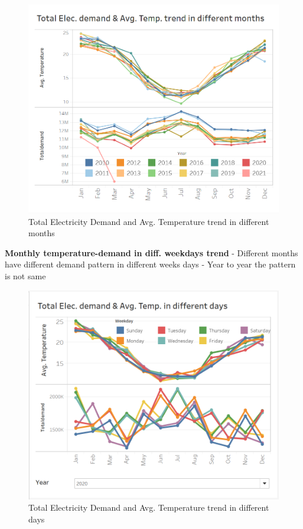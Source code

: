 \documentclass[mstat,12pt]{unswthesis}
\begin{document}
\begin{figure}[H]
\includegraphics{snapshots1/Slide 2 snapshot.png}
\caption{Total Electricity Demand and Avg. Temperature trend in different months}\label{4.1}
\end{figure}

\textbf{Monthly temperature-demand in diff. weekdays trend} \newline
\newline - Different months have different demand pattern in different
weeks days \newline - Year to year the pattern is not same \newline

\begin{figure}[H]
\includegraphics{snapshots1/Slide 3 snapshot 1.png}
\caption{Total Electricity Demand and Avg. Temperature trend in different days}\label{4.2}
\end{figure}
\end{document}

